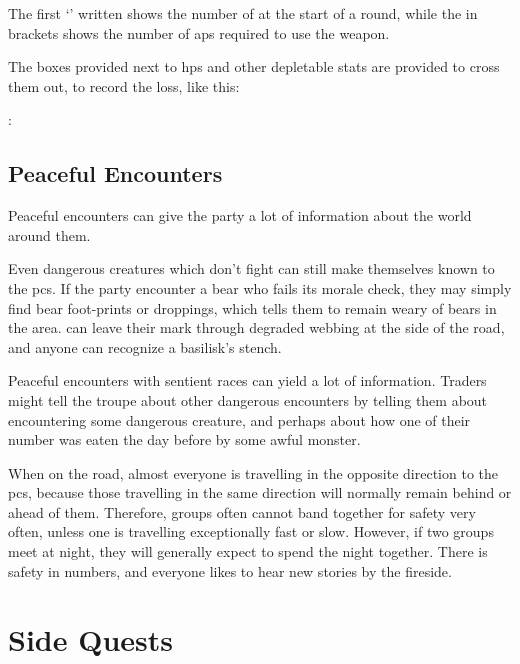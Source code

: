 \begin{multicols}{2}
The first `' written shows the number of  at the start of a round, while the  in brackets shows the number of \glspl{ap} required to use the weapon.

The boxes provided next to \glspl{hp} and other depletable stats are provided to cross them out, to record the loss, like this: 

 :\addtocounter{hp}{-3}
\Repeat{\value{hp}}{\sqn}

\subsection{Peaceful Encounters}

Peaceful encounters can give the party a lot of information about the world around them.

Even dangerous creatures which don't fight can still make themselves known to the \glspl{pc}.
If the party encounter a bear who fails its morale check, they may simply find bear foot-prints or droppings, which tells them to remain weary of bears in the area.
\iftoggle{aif}{Chitincrawler}{Giant spiders}
can leave their mark through degraded webbing at the side of the road, and anyone can recognize a basilisk's stench.

Peaceful encounters with sentient races can yield a lot of information.
Traders might tell the troupe about other dangerous encounters by telling them about encountering some dangerous creature, and perhaps about how one of their number was eaten the day before by some awful monster.

When on the road, almost everyone is travelling in the opposite direction to the \glspl{pc}, because those travelling in the same direction will normally remain behind or ahead of them.
Therefore, groups often cannot band together for safety very often, unless one is travelling exceptionally fast or slow.
However, if two groups meet at night, they will generally expect to spend the night together.
There is safety in numbers, and everyone likes to hear new stories by the fireside.

\end{multicols}

\section{Side Quests}\label{sidequests}

